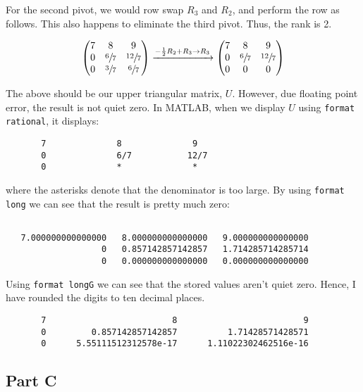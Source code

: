 \documentclass[12pt]{article}
\newcommand{\code}[1]{\texttt{#1}}
\begin{document}
For the second pivot, we would row swap $R_3$ and $R_2$, and perform the row as follows. This also happens to eliminate the third pivot. Thus, the rank is 2.

$$
\begin{pmatrix}
     7 & 8 & 9 \\
     0 & \sfrac{6}{7} & \sfrac{12}{7} \\
     0 & \sfrac{3}{7} & \sfrac{6}{7}
\end{pmatrix}
\xrightarrow[]{-\frac{1}{2}R_2 + R_3 \to R_3}
\begin{pmatrix}
     7 & 8 & 9 \\
     0 & \sfrac{6}{7} & \sfrac{12}{7} \\
     0 & 0 & 0
\end{pmatrix}
$$

The above should be our upper triangular matrix, $U$. However, due floating point error, the result is not quiet zero. In MATLAB, when we display $U$ using \code{format rational}, it displays:

\begin{verbatim}
       7              8              9       
       0              6/7           12/7     
       0              *              *   
\end{verbatim}

where the asterisks denote that the denominator is too large. By using \code{format long} we can see that the result is pretty much zero:

\begin{verbatim}
    
   7.000000000000000   8.000000000000000   9.000000000000000
                   0   0.857142857142857   1.714285714285714
                   0   0.000000000000000   0.000000000000000
\end{verbatim}

Using \code{format longG} we can see that the stored values aren't quiet zero. Hence, I have rounded the digits to ten decimal places.

\begin{verbatim}
       7                         8                         9
       0         0.857142857142857          1.71428571428571
       0      5.55111512312578e-17      1.11022302462516e-16
\end{verbatim}

\subsection*{Part C}
\end{document}
